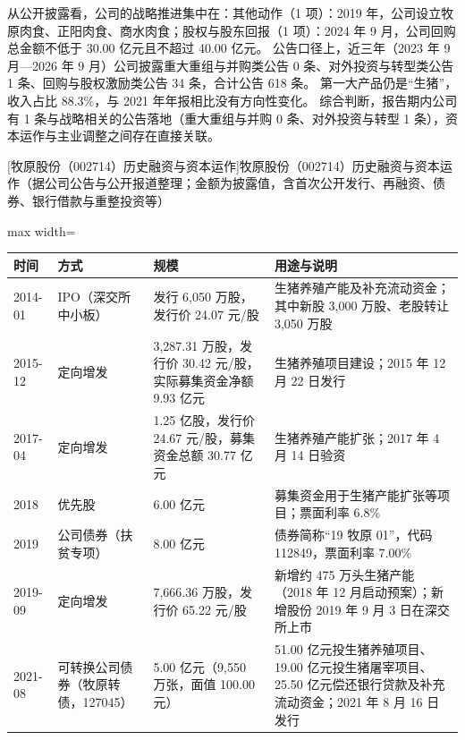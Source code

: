  从公开披露看，公司的战略推进集中在：其他动作（1 项）：2019 年，公司设立牧原肉食、正阳肉食、商水肉食；股权与股东回报（1 项）：2024 年 9 月，公司回购总金额不低于 30.00 亿元且不超过 40.00 亿元。 公告口径上，近三年（2023 年 9 月---2026 年 9 月）公司披露重大重组与并购类公告 0 条、对外投资与转型类公告 1 条、回购与股权激励类公告 34 条，合计公告 618 条。 第一大产品仍是“生猪”，收入占比 88.3\%，与 2021 年年报相比没有方向性变化。 综合判断，报告期内公司有 1 条与战略相关的公告落地（重大重组与并购 0 条、对外投资与转型 1 条），资本运作与主业调整之间存在直接关联。

\begin{center}\small\setlength{\tabcolsep}{4pt}
[牧原股份（002714）历史融资与资本运作]{牧原股份（002714）历史融资与资本运作（据公司公告与公开报道整理；金额为披露值，含首次公开发行、再融资、债券、银行借款与重整投资等）}
\begin{adjustbox}{max width=\textwidth}
\begin{tabular}{@{}p{1.45cm}p{2.55cm}p{4.05cm}p{4.95cm}@{}}
\toprule
时间 & 方式 & 规模 & 用途与说明 \\
\midrule
2014-01 & IPO（深交所中小板） & 发行 6,\allowbreak{}050 万股，\allowbreak{}发行价 24.07 元/\allowbreak{}股 & 生猪养殖产能及补充流动资金；其中新股 3,\allowbreak{}000 万股、\allowbreak{}老股转让 3,\allowbreak{}050 万股 \\
2015-12 & 定向增发 & 3,\allowbreak{}287.31 万股，\allowbreak{}发行价 30.42 元/\allowbreak{}股，\allowbreak{}实际募集资金净额 9.93 亿元 & 生猪养殖项目建设；2015 年 12 月 22 日发行 \\
2017-04 & 定向增发 & 1.25 亿股，\allowbreak{}发行价 24.67 元/\allowbreak{}股，\allowbreak{}募集资金总额 30.77 亿元 & 生猪养殖产能扩张；2017 年 4 月 14 日验资 \\
2018 & 优先股 & 6.00 亿元 & 募集资金用于生猪产能扩张等项目；票面利率 6.8\% \\
2019 & 公司债券（扶贫专项） & 8.00 亿元 & 债券简称“19 牧原 01”，\allowbreak{}代码 112849，\allowbreak{}票面利率 7.00\% \\
2019-09 & 定向增发 & 7,\allowbreak{}666.36 万股，\allowbreak{}发行价 65.22 元/\allowbreak{}股 & 新增约 475 万头生猪产能（2018 年 12 月启动预案）；新增股份 2019 年 9 月 3 日在深交所上市 \\
2021-08 & 可转换公司债券（牧原转债，127045） & 5.00 亿元（9,\allowbreak{}550 万张，\allowbreak{}面值 100.00 元） & 51.00 亿元投生猪养殖项目、\allowbreak{}19.00 亿元投生猪屠宰项目、\allowbreak{}25.50 亿元偿还银行贷款及补充流动资金；2021 年 8 月 16 日发行 \\

\end{tabular}
\end{adjustbox}
\end{center}
